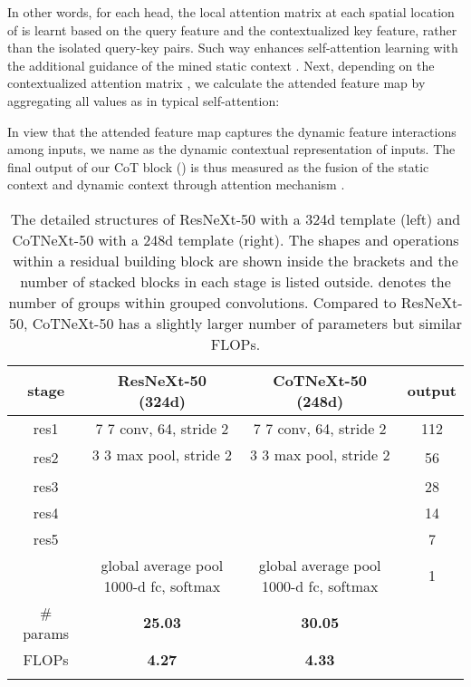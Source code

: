 \documentclass[10pt,twocolumn,letterpaper]{article}
\begin{document}
In other words, for each head, the local attention matrix at each spatial location of  is learnt based on the query feature and the contextualized key feature, rather than the isolated query-key pairs. Such way enhances self-attention learning with the additional guidance of the mined static context . Next, depending on the contextualized attention matrix , we calculate the attended feature map  by aggregating all values  as in typical self-attention:

In view that the attended feature map  captures the dynamic feature interactions among inputs, we name  as the dynamic contextual representation of inputs. The final output of our CoT block () is thus measured as the fusion of the static context  and dynamic context  through attention mechanism \cite{li2019selective}.






\begin{table}[!tb]\scriptsize
  \centering
\caption{\small The detailed structures of ResNeXt-50 with a 324d template (left) and CoTNeXt-50 with a 248d template (right). The shapes and operations within a residual building block are shown inside the brackets and the number of stacked blocks in each stage is listed outside.  denotes the number of groups within grouped convolutions.
  Compared to ResNeXt-50, CoTNeXt-50 has a slightly larger number of parameters but similar FLOPs.
}
  \setlength\extrarowheight{1.1pt}
\begin{tabular}{c|c|c|c}
\Xhline{2\arrayrulewidth}
\!\!stage      & ResNeXt-50 (324d)        & \textbf{CoTNeXt-50 (248d)}  & \!\!output\!\!      \\ \hline
\!\!res1       & 7  7 conv, 64, stride 2  & 7  7 conv, 64, stride 2 & \!\!112  112\!\!  \\ \hline
\multirow{2}{*}{\!\!res2}
              & 3  3 max pool, stride 2  & 3  3 max pool, stride 2 & \multirow{2}{*}{\!\!56  56\!\!} \\ \cline{2-3}
     &  \!\!\!
     &  \!\!\!
     & \\ \hline

\!\!res3
     & \!\!\!
     & \!\!\!
     & \!\!28  28\!\! \\ \hline
\!\!res4
     & \!\!\!
     & \!\!\!
     & \!\!14  14\!\! \\ \hline
\!\!res5
     & \!\!\!
     & \!\!\!
     & \!\!7  7\!\! \\ \hline
     & \makecell{global average pool \\ 1000-d fc, softmax} & \makecell{global average pool \\ 1000-d fc, softmax} & \!\!1  1\!\! \\ \hline
\# params                     & \textbf{25.03}          & \textbf{30.05}    &   \\ \hline
FLOPs                         & \textbf{4.27}       & \textbf{4.33}         &   \\ \Xhline{2\arrayrulewidth}
\end{tabular}
\vspace{-0.2in}
\label{table:ResNeXt}
\end{table}
\end{document}

